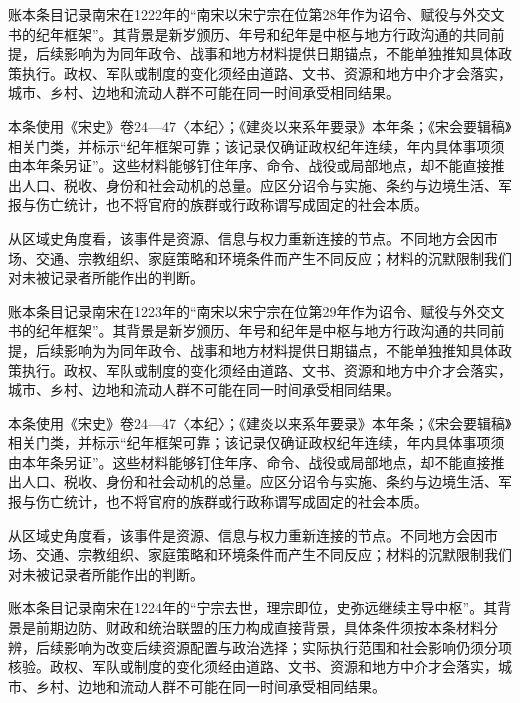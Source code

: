 账本条目记录南宋在1222年的“南宋以宋宁宗在位第28年作为诏令、赋役与外交文书的纪年框架”。其背景是新岁颁历、年号和纪年是中枢与地方行政沟通的共同前提，后续影响为为同年政令、战事和地方材料提供日期锚点，不能单独推知具体政策执行。政权、军队或制度的变化须经由道路、文书、资源和地方中介才会落实，城市、乡村、边地和流动人群不可能在同一时间承受相同结果。

本条使用《宋史》卷24—47〈本纪〉；《建炎以来系年要录》本年条；《宋会要辑稿》相关门类，并标示“纪年框架可靠；该记录仅确证政权纪年连续，年内具体事项须由本年条另证”。这些材料能够钉住年序、命令、战役或局部地点，却不能直接推出人口、税收、身份和社会动机的总量。应区分诏令与实施、条约与边境生活、军报与伤亡统计，也不将官府的族群或行政称谓写成固定的社会本质。

从区域史角度看，该事件是资源、信息与权力重新连接的节点。不同地方会因市场、交通、宗教组织、家庭策略和环境条件而产生不同反应；材料的沉默限制我们对未被记录者所能作出的判断。

账本条目记录南宋在1223年的“南宋以宋宁宗在位第29年作为诏令、赋役与外交文书的纪年框架”。其背景是新岁颁历、年号和纪年是中枢与地方行政沟通的共同前提，后续影响为为同年政令、战事和地方材料提供日期锚点，不能单独推知具体政策执行。政权、军队或制度的变化须经由道路、文书、资源和地方中介才会落实，城市、乡村、边地和流动人群不可能在同一时间承受相同结果。

本条使用《宋史》卷24—47〈本纪〉；《建炎以来系年要录》本年条；《宋会要辑稿》相关门类，并标示“纪年框架可靠；该记录仅确证政权纪年连续，年内具体事项须由本年条另证”。这些材料能够钉住年序、命令、战役或局部地点，却不能直接推出人口、税收、身份和社会动机的总量。应区分诏令与实施、条约与边境生活、军报与伤亡统计，也不将官府的族群或行政称谓写成固定的社会本质。

从区域史角度看，该事件是资源、信息与权力重新连接的节点。不同地方会因市场、交通、宗教组织、家庭策略和环境条件而产生不同反应；材料的沉默限制我们对未被记录者所能作出的判断。

账本条目记录南宋在1224年的“宁宗去世，理宗即位，史弥远继续主导中枢”。其背景是前期边防、财政和统治联盟的压力构成直接背景，具体条件须按本条材料分辨，后续影响为改变后续资源配置与政治选择；实际执行范围和社会影响仍须分项核验。政权、军队或制度的变化须经由道路、文书、资源和地方中介才会落实，城市、乡村、边地和流动人群不可能在同一时间承受相同结果。


